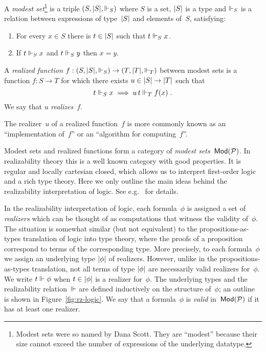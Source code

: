 \begin{definition}
  A \emph{modest set}\footnote{Modest sets were so named by Dana
    Scott. They are ``modest'' because their size cannot exceed the
    number of expressions of the underlying datatype.} is a triple
  $(S, |S|, {\Vdash_S})$ where $S$ is a set, $|S|$ is a type and
  $\Vdash_S$ is a relation between expressions of type~$|S|$ and
  elements of~$S$, satisfying:
  \begin{enumerate}
  \item For every $x \in S$ there is $t \in |S|$ such that $t \Vdash_S
    x$.
  \item If $t \Vdash_S x$ and $t \Vdash_S y$ then $x = y$.
  \end{enumerate}
  A \emph{realized function} $f : (S, |S|, {\Vdash_S}) \to (T, |T|,
  {\Vdash_T})$ between modest sets is a function $f : S \to T$ for which
  there exists $u \in |S| \to |T|$ such that
  \begin{equation*}
    t \Vdash_S x \implies u\,t \Vdash_T f(x) \;.
  \end{equation*}
  We say that $u$ \emph{realizes}~$f$.
\end{definition}

The realizer~$u$ of a realized function~$f$ is more commonly known as
an ``implementation of~$f$'' or an ``algorithm for computing~$f$''.

Modest sets and realized functions form a category of \emph{modest
  sets~$\mathsf{Mod}(\mathcal{P})$}. In realizability theory this is a well known
category with good properties. It is regular and locally cartesian
closed, which allows us to interpret first-order logic and a rich type
theory. Here we only outline the main ideas behind the realizability
interpretation of logic. See e.g.~\cite{Bauer:00} for details.

In the realizability interpretation of logic, each formula~$\phi$ is
assigned a set of \emph{realizers} which can be thought of as
computations that witness the validity of~$\phi$. The situation is
somewhat similar (but not equivalent) to the propositions-as-types
translation of logic into type theory, where the proofs of a
proposition correspond to terms of the corresponding type. More
precisely, to each formula~$\phi$ we assign an underlying type
$|\phi|$ of realizers. However, unlike in the propositions-as-types
translation, not all terms of type $|\phi|$ are necessarily valid
realizers for~$\phi$. We write $t \Vdash \phi$ when $t \in |\phi|$ is
a realizer for~$\phi$. The underlying types and the
realizability relation~$\Vdash$ are defined inductively on the structure
of~$\phi$; an outline is shown in Figure~\ref{fig:rz-logic}. We say that a
formula~$\phi$ is \emph{valid} in~$\mathsf{Mod}(\mathcal{P})$ if it has at least one
realizer.

